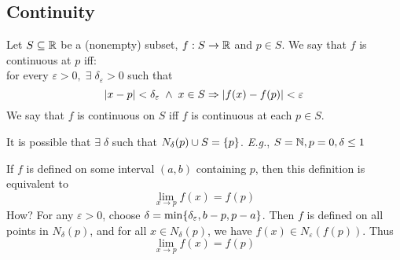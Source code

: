 
\subsection{Continuity}
\begin{defn} \label{defn:cont}
    Let $S \subseteq \mathbb{R}$ be a (nonempty) subset, $f: S \to \mathbb{R}$ and $p \in S$. We say that $f$ is continuous at $p$ iff: \\
    for every $\varepsilon > 0, \;\exists\; \delta_{\varepsilon} > 0$ such that \[
        \abs{x - p} < \delta_{\varepsilon} \;\land\; x \in S \implies \abs{f(x) - f(p)} < \varepsilon
    \] We say that $f$ is continuous on $S$ iff $f$ is continuous at each $p \in S$.
\end{defn}
\begin{rem}
    It is possible that $\exists\; \delta$ such that $N_{\delta}(p) \cup S = \set{p}$. \textit{E.g.}, $S = \mathbb{N}, p = 0, \delta \leq 1$
\end{rem}
\begin{rem}
    If $f$ is defined on some interval $(a, b)$ containing $p$, then this definition is equivalent to \[
        \lim_{x \to p} f(x) = f(p)
    \] \textcolor{red!85!black}{How?} For any $\varepsilon > 0$, choose $\delta = \min \set{\delta_{\varepsilon}, b - p, p - a}$. Then $f$ is defined on all points in $N_{\delta}(p)$, and for all $x \in N_{\delta}(p)$, we have $f(x) \in N_{\varepsilon}(f(p))$. Thus \[
        \lim_{x \to p} f(x) = f(p)
    \]
\end{rem}

